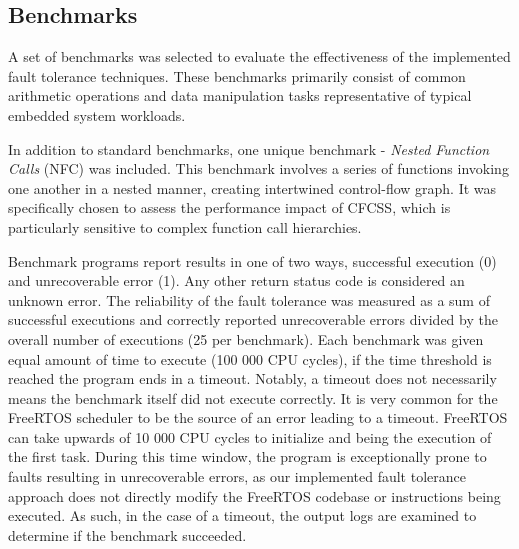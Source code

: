 \subsection{Benchmarks}

A set of benchmarks was selected to evaluate the effectiveness of the implemented fault tolerance techniques. These benchmarks primarily consist of common arithmetic operations and data manipulation tasks representative of typical embedded system workloads. 

In addition to standard benchmarks, one unique benchmark - \textit{Nested Function Calls} (NFC) was included. This benchmark involves a series of functions invoking one another in a nested manner, creating intertwined control-flow graph. It was specifically chosen to assess the performance impact of CFCSS, which is particularly sensitive to complex function call hierarchies.

Benchmark programs report results in one of two ways, successful execution (0) and unrecoverable error (1). Any other return status code is considered an unknown error. The reliability of the fault tolerance was measured as a sum of successful executions and correctly reported unrecoverable errors divided by the overall number of executions (25 per benchmark). Each benchmark was given equal amount of time to execute (100 000 CPU cycles), if the time threshold is reached the program ends in a timeout. Notably, a timeout does not necessarily means the benchmark itself did not execute correctly. It is very common for the FreeRTOS scheduler to be the source of an error leading to a timeout. FreeRTOS can take upwards of 10 000 CPU cycles to initialize and being the execution of the first task. During this time window, the program is exceptionally prone to faults resulting in unrecoverable errors, as our implemented fault tolerance approach does not directly modify the FreeRTOS codebase or instructions being executed. As such, in the case of a timeout, the output logs are examined to determine if the benchmark succeeded.

\begin{table}[h]
\centering
{}
\caption{Fibonacci sequence benchmark statistics}
\label{tab:fib_bench}
\end{table}

